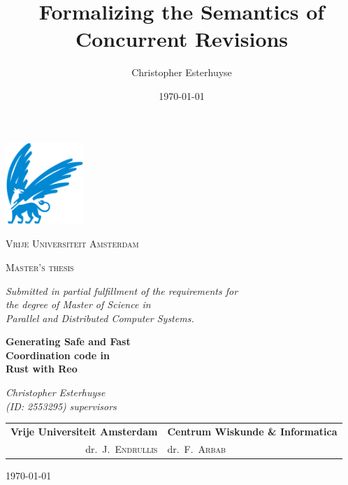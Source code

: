 \documentclass[11pt]{report}
\title{Formalizing the Semantics of Concurrent Revisions}
\author{Christopher Esterhuyse}
\date{\today}
\begin{document}
\begin{titlepage}
	\centering
	\includegraphics[width=0.22\textwidth, trim={0 0.15cm 0 0}, clip]{img/vu.png}
	\par
	{\scshape\huge Vrije Universiteit Amsterdam \par}
	\vspace{1.5cm}
	{\scshape\LARGE Master's thesis\par \par
	\vspace{0.2cm}
	\small \textit{Submitted in partial fulfillment of the requirements for\\ the degree of Master of Science in\\ Parallel and Distributed Computer Systems.}\par}
	\vspace{1.5cm}
	{\Huge\bfseries \rm \textbf{Generating Safe and Fast\\ Coordination code in\\ Rust with Reo}\par}
	\vspace{1.5cm}
	{\Large\itshape\rm \noindent\textit{Christopher Esterhuyse}\\}
	\vspace{1mm}
	\textit{(ID: 2553295)}
	\vfill
		\rm \noindent \textit{supervisors} \\ \vspace{0.15cm}
	\begin{tabular}{r@{\hskip 0.4in}l}
\rm \hspace{3mm} \textbf{Vrije Universiteit Amsterdam} & \textbf{Centrum Wiskunde \& Informatica} \\ 
dr.\ J.\ \textsc{Endrullis} & dr.\ F.\ \textsc{Arbab}
\end{tabular}

	\vfill

	{\large \today\par}
\end{titlepage}
\end{document}
